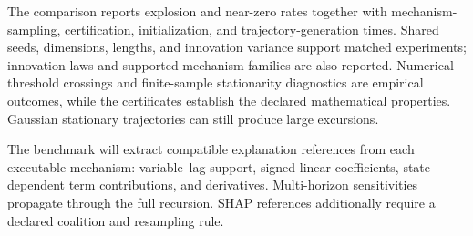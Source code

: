 The comparison reports explosion and near-zero rates together with
mechanism-sampling, certification, initialization, and trajectory-generation
times. Shared seeds, dimensions, lengths, and innovation variance support
matched experiments; innovation laws and supported mechanism families are
also reported. Numerical threshold crossings and finite-sample stationarity
diagnostics are empirical outcomes, while the certificates establish the
declared mathematical properties. Gaussian stationary trajectories can still
produce large excursions.

The benchmark will extract compatible explanation references from each
executable mechanism: variable--lag support, signed linear coefficients,
state-dependent term contributions, and derivatives. Multi-horizon
sensitivities propagate through the full recursion. SHAP references additionally
require a declared coalition and resampling rule.
